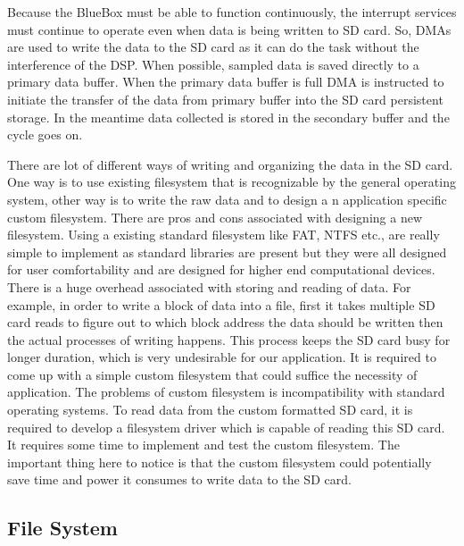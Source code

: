Because the BlueBox must be able to function continuously, the interrupt services must continue to operate even when data is being written to SD card. So, DMAs are used to write the data to the SD card as it can do the task without the interference of the DSP. When possible, sampled data is saved directly to a primary data buffer.  When the primary data buffer is full DMA is instructed to initiate the transfer of the data from primary buffer into the SD card persistent storage. In the meantime data collected is stored in the secondary buffer and the cycle goes on. 

 There are lot of different ways of writing and organizing the data in the SD card. One way is to use existing filesystem that is recognizable by the general operating system, other way is to write the raw data and to design a n application specific custom filesystem. There are pros and cons associated with designing a new filesystem. Using a existing standard filesystem like FAT, NTFS etc., are really simple to implement as standard libraries are present but they were all designed for user comfortability and are designed for higher end computational devices. There is a huge overhead associated with storing and reading of data. For example, in order to write a block of data into a file, first it takes multiple SD card reads to figure out to which block address the data should be written then the actual processes of writing happens. This process keeps the SD card busy for longer duration, which is very undesirable for our application. It is required to come up with a simple custom filesystem that could suffice the necessity of application. The problems of custom filesystem is incompatibility with standard operating systems. To read data from the custom formatted SD card, it is required to develop a filesystem driver which is capable of reading this SD card. It requires some time to implement and test the custom filesystem. The important thing here to notice is that the custom filesystem could potentially save time and power it consumes to write data to the SD card.


\subsection{File System}\label{filesystem} 

